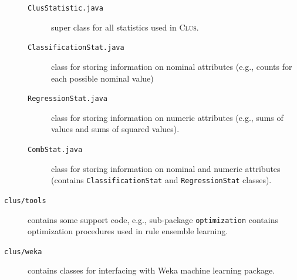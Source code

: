 \documentclass[a4paper]{report}
\newcommand{\clus}{\textsc{Clus}}
\newcommand{\comment}[1]{} %
\begin{document}
\begin{description}
	\begin{description}
		\item[\texttt{ClusStatistic.java}] super class for all statistics used in \clus.
		\item[\texttt{ClassificationStat.java}] class for storing information on nominal attributes (e.g., counts for each possible nominal value)
		\item[\texttt{RegressionStat.java}] class for storing information on numeric attributes (e.g., sums of values and sums of squared values).
		\item[\texttt{CombStat.java}] class for storing information on nominal and numeric attributes (contains \texttt{ClassificationStat} and \texttt{RegressionStat} classes).
	\end{description}
 	\item[\texttt{clus/tools}] contains some support code, e.g., sub-package \texttt{optimization} contains optimization procedures used in rule ensemble learning.
 	\item[\texttt{clus/weka}] contains classes for interfacing with Weka machine learning package.
\end{description}

\end{document}
